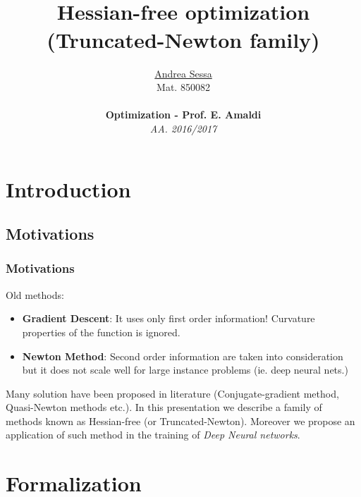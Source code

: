 \documentclass[professionalfont]{beamer}
\title[Hessian-free optimization]{\textbf{\\Hessian-free optimization \\ (Truncated-Newton family)}}
\author[A. Sessa]{\underline{Andrea Sessa} \\ \small{Mat. 850082} \\
\vspace{1mm}
{\small \href{}{\nolinkurl{}}}\\
{\textbf{Optimization - Prof. E. Amaldi} \\ \textit{AA. 2016/2017}}}
\date{}
\begin{document}
  \begin{frame}[plain]
    \titlepage
  \end{frame}

  \section{Introduction}

  \subsection{Motivations}
  \begin{frame}
	\frametitle{Motivations}
  Old methods:
    \begin{itemize}
      \item \textbf{Gradient Descent}: It uses only first order information! Curvature properties
        of the function is ignored.
      \item \textbf{Newton Method}: Second order information are taken into consideration but
        it does not scale well for large instance problems (ie. deep neural nets.)
    \end{itemize}
    Many solution have been proposed in literature (Conjugate-gradient method, Quasi-Newton methods etc.).\newline\newline
    In this presentation we describe a family of methods known as Hessian-free (or Truncated-Newton).\newline\newline
    Moreover we propose an application of such method in the training of \textit{Deep Neural networks}.\newline

  \end{frame}

  \section{Formalization}
\end{document}
